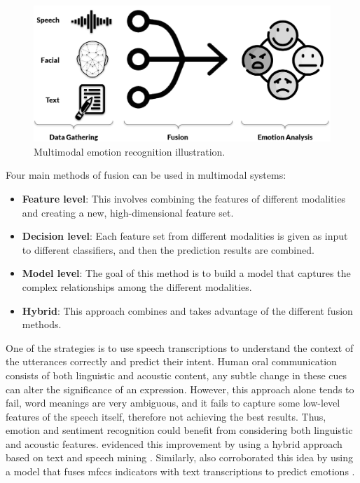 \begin{figure}[h]
  \centering
  \includegraphics[width=.8\linewidth]{figs/2_state_of_the_art/multimodality.png}
  \caption{Multimodal emotion recognition illustration.}
  \label{fig:multimodal}
\end{figure}

Four main methods of fusion can be used in multimodal systems:
\begin{itemize}
\item \textbf{Feature level}: This involves combining the features of different modalities and creating a new, high-dimensional feature set.

\item \textbf{Decision level}: Each feature set from different modalities is given as input to different classifiers, and then the prediction results are combined.

\item \textbf{Model level}: The goal of this method is to build a model that captures the complex relationships among the different modalities.

\item \textbf{Hybrid}: This approach combines and takes advantage of the different fusion methods.

\end{itemize}

One of the strategies is to use speech transcriptions to understand the context of the utterances correctly and predict their intent. Human oral communication consists of both linguistic and acoustic content, any subtle change in these cues can alter the significance of an expression. However, this approach alone tends to fail, word meanings are very ambiguous, and it fails to capture some low-level features of the speech itself, therefore not achieving the best results. Thus, emotion and sentiment recognition could benefit from considering both linguistic and acoustic features. \citeauthor{BHASKAR2015635} evidenced this improvement by using a hybrid approach based on text and speech mining \cite{BHASKAR2015635}. Similarly, \citeauthor{ser_strategies} also corroborated this idea by using a model that fuses \ac{mfccs} indicators with text transcriptions to predict emotions \cite{ser_strategies}.

